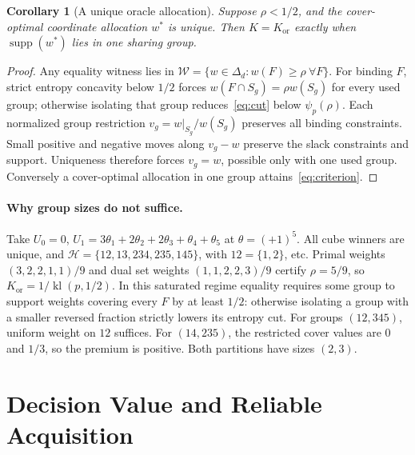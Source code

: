 \documentclass[sigconf,anonymous,review]{acmart}
\newtheorem{corollary}[theorem]{Corollary}
\newcommand{\kl}{\operatorname{kl}}
\newcommand{\Kor}{K_{\mathrm{or}}}
\newcommand{\cH}{\mathcal H}
\newcommand{\cW}{\mathcal W}
\begin{document}
\begin{corollary}[A unique oracle allocation]\label{cor:unique}
Suppose $\rho<1/2$, and the cover-optimal coordinate allocation $w^*$ is unique. Then $K=\Kor$ exactly when $\operatorname{supp}(w^*)$ lies in one sharing group.
\end{corollary}
\begin{proof}
Any equality witness lies in $\cW=\{w\in\Delta_d:w(F)\ge\rho\ \forall F\}$. For binding $F$, strict entropy concavity below $1/2$ forces $w(F\cap S_g)=\rho w(S_g)$ for every used group; otherwise isolating that group reduces~\eqref{eq:cut} below $\psi_p(\rho)$. Each normalized group restriction $v_g=w|_{S_g}/w(S_g)$ preserves all binding constraints. Small positive and negative moves along $v_g-w$ preserve the slack constraints and support. Uniqueness therefore forces $v_g=w$, possible only with one used group. Conversely a cover-optimal allocation in one group attains~\eqref{eq:criterion}.
\end{proof}

\paragraph{Why group sizes do not suffice.}
Take $U_0=0$, $U_1=3\theta_1+2\theta_2+2\theta_3+\theta_4+\theta_5$ at $\theta=(+1)^5$. All cube winners are unique, and
$\cH=\{12,13,234,235,145\}$, with $12=\{1,2\}$, etc. Primal weights $(3,2,2,1,1)/9$ and dual set weights $(1,1,2,2,3)/9$ certify $\rho=5/9$, so $\Kor=1/\kl(p,1/2)$. In this saturated regime equality requires some group to support weights covering every $F$ by at least $1/2$: otherwise isolating a group with a smaller reversed fraction strictly lowers its entropy cut. For groups $(12,345)$, uniform weight on $12$ suffices. For $(14,235)$, the restricted cover values are $0$ and $1/3$, so the premium is positive. Both partitions have sizes $(2,3)$.

\section{Decision Value and Reliable Acquisition}
\end{document}
